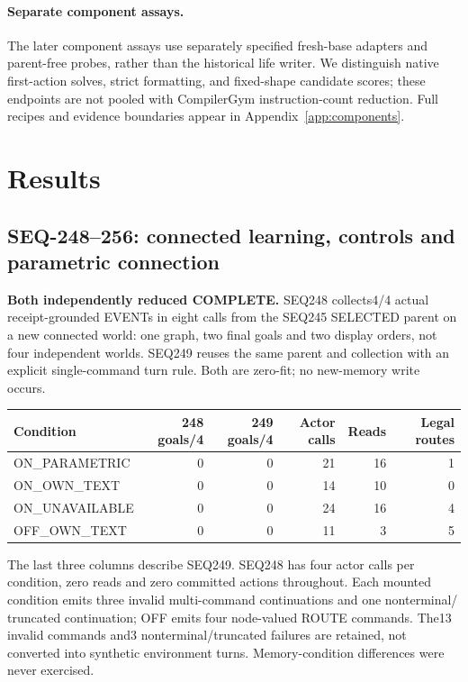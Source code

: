\documentclass{article}
\begin{document}
\paragraph{Separate component assays.} The later component assays use separately specified fresh-base adapters and parent-free probes, rather than the historical life writer. We distinguish native first-action solves, strict formatting, and fixed-shape candidate scores; these endpoints are not pooled with CompilerGym instruction-count reduction. Full recipes and evidence boundaries appear in Appendix~\ref{app:components}.

\section{Results}
\subsection{SEQ-248--256: connected learning, controls and parametric connection}
\label{sec:event-two-hop-readout}

\textbf{Both independently reduced COMPLETE.} SEQ248 collects4/4 actual
receipt-grounded EVENTs in eight calls from the SEQ245 SELECTED parent on a
new connected world: one graph, two final goals and two display orders, not
four independent worlds. SEQ249 reuses the same parent and collection with an
explicit single-command turn rule. Both are zero-fit; no new-memory write occurs.

\begin{center}
\small
\begin{tabular}{lrrrrr}
\toprule
Condition & 248 goals/4 & 249 goals/4 & Actor calls & Reads & Legal routes \\
\midrule
ON\_PARAMETRIC & 0 & 0 & 21 & 16 & 1 \\
ON\_OWN\_TEXT & 0 & 0 & 14 & 10 & 0 \\
ON\_UNAVAILABLE & 0 & 0 & 24 & 16 & 4 \\
OFF\_OWN\_TEXT & 0 & 0 & 11 & 3 & 5 \\
\bottomrule
\end{tabular}
\end{center}
The last three columns describe SEQ249. SEQ248 has four actor calls per
condition, zero reads and zero committed actions throughout. Each mounted
condition emits three invalid multi-command continuations and one nonterminal/
truncated continuation; OFF emits four node-valued ROUTE commands. The13 invalid
commands and3 nonterminal/truncated failures are retained, not converted into
synthetic environment turns. Memory-condition differences were never exercised.
\end{document}
